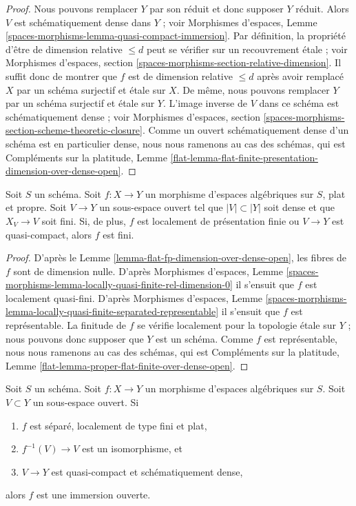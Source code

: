 \begin{proof}
Nous pouvons remplacer $Y$ par son réduit et donc supposer $Y$ réduit.
Alors $V$ est schématiquement dense dans $Y$ ; voir
Morphismes d'espaces, Lemme
\ref{spaces-morphisms-lemma-quasi-compact-immersion}.
Par définition, la propriété d'être de dimension relative $\leq d$ peut
se vérifier sur un recouvrement étale ; voir
Morphismes d'espaces, section \ref{spaces-morphisms-section-relative-dimension}.
Il suffit donc de montrer que $f$ est de dimension relative $\leq d$
après avoir remplacé $X$ par un schéma surjectif et étale sur $X$.
De même, nous pouvons remplacer $Y$ par un schéma surjectif et
étale sur $Y$. L'image inverse de $V$ dans ce schéma est schématiquement
dense ; voir
Morphismes d'espaces, section
\ref{spaces-morphisms-section-scheme-theoretic-closure}.
Comme un ouvert schématiquement dense d'un schéma est en particulier
dense, nous nous ramenons au cas des schémas, qui est
Compléments sur la platitude, Lemme
\ref{flat-lemma-flat-finite-presentation-dimension-over-dense-open}.
\end{proof}

\begin{lemma}
\label{lemma-proper-flat-finite-over-dense-open}
Soit $S$ un schéma. Soit $f : X \to Y$ un morphisme d'espaces algébriques
sur $S$, plat et propre. Soit $V \to Y$ un sous-espace ouvert
tel que $|V| \subset |Y|$ soit dense et que $X_V \to V$ soit fini. Si, de plus,
$f$ est localement de présentation finie ou $V \to Y$ est quasi-compact,
alors $f$ est fini.
\end{lemma}

\begin{proof}
D'après le Lemme \ref{lemma-flat-fp-dimension-over-dense-open},
les fibres de $f$ sont de dimension nulle.
D'après Morphismes d'espaces, Lemme
\ref{spaces-morphisms-lemma-locally-quasi-finite-rel-dimension-0}
il s'ensuit que $f$ est localement quasi-fini.
D'après Morphismes d'espaces, Lemme
\ref{spaces-morphisms-lemma-locally-quasi-finite-separated-representable}
il s'ensuit que $f$ est représentable.
La finitude de $f$ se vérifie localement pour la topologie étale sur $Y$ ;
nous pouvons donc supposer que $Y$ est un schéma. Comme $f$ est représentable,
nous nous ramenons au cas des schémas, qui est
Compléments sur la platitude, Lemme \ref{flat-lemma-proper-flat-finite-over-dense-open}.
\end{proof}

\begin{lemma}
\label{lemma-zariski}
Soit $S$ un schéma.
Soit $f : X \to Y$ un morphisme d'espaces algébriques sur $S$.
Soit $V \subset Y$ un sous-espace ouvert. Si
\begin{enumerate}
\item $f$ est séparé, localement de type fini et plat,
\item $f^{-1}(V) \to V$ est un isomorphisme, et
\item $V \to Y$ est quasi-compact et schématiquement dense,
\end{enumerate}
alors $f$ est une immersion ouverte.
\end{lemma}

